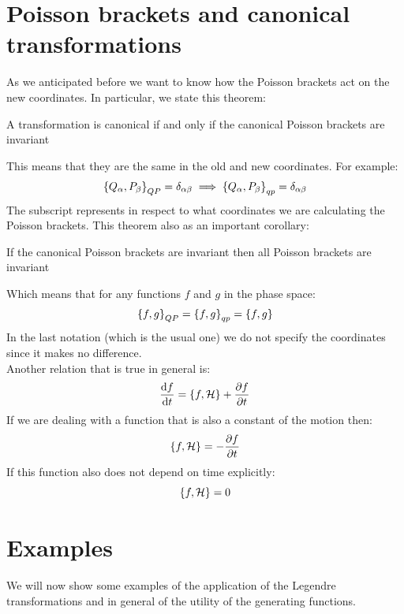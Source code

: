 \section{Poisson brackets and canonical transformations}
As we anticipated before we want to know how the Poisson brackets act on the new coordinates. In particular, we state this theorem:
\begin{theorem}{}
  A transformation is canonical if and only if the canonical Poisson brackets are invariant
\end{theorem}
This means that they are the same in the old and new coordinates. For example:
\begin{equation}
    \pb{Q_{\alpha}}{P_{\beta}}_{QP} = \delta_{\alpha \beta} \implies \pb{Q_{\alpha}}{P_{\beta}}_{qp} = \delta_{\alpha \beta}
\end{equation}
The subscript represents in respect to what coordinates we are calculating the Poisson brackets. This theorem also as an important corollary:
\begin{corollary}{}
    If the canonical Poisson brackets are invariant then all Poisson brackets are invariant
\end{corollary}
Which means that for any functions $f$ and $g$ in the phase space:
\begin{equation}
    \pb{f}{g}_{QP} = \pb{f}{g}_{qp} = \pb{f}{g}
\end{equation}
In the last notation (which is the usual one) we do not specify the coordinates since it makes no difference.\\
Another relation that is true in general is:
\begin{equation}
    \dv{f}{t} = \pb{f}{\hamfun} + \pdv{f}{t}
\end{equation}
If we are dealing with a function that is also a constant of the motion then:
\begin{equation}
    \pb{f}{\hamfun} = - \pdv{f}{t}
\end{equation}
If this function also does not depend on time explicitly:
\begin{equation}
    \pb{f}{\hamfun} = 0
\end{equation}
\section{Examples}
We will now show some examples of the application of the Legendre transformations and in general of the utility of the generating functions.
